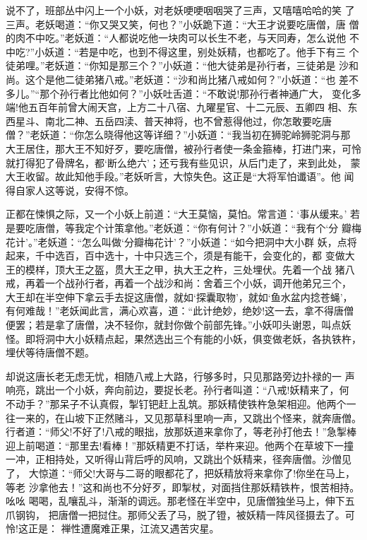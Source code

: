 说不了，班部丛中闪上一个小妖，对老妖哽哽咽咽哭了三声，又嘻嘻哈哈的笑
了三声。老妖喝道：“你又哭又笑，何也？”小妖跪下道：“大王才说要吃唐僧，唐
僧的肉不中吃。”老妖道：“人都说吃他一块肉可以长生不老，与天同寿，怎么说他
不中吃?”小妖道：“若是中吃，也到不得这里，别处妖精，也都吃了。他手下有三
个徒弟哩。”老妖道：“你知是那三个？”小妖道：“他大徒弟是孙行者，三徒弟是
沙和尚。这个是他二徒弟猪八戒。”老妖道：“沙和尚比猪八戒如何？”小妖道：“也
差不多儿。”“那个孙行者比他如何？”小妖吐舌道：“不敢说!那孙行者神通广大，
变化多端!他五百年前曾大闹天宫，上方二十八宿、九曜星官、十二元辰、五卿四
相、东西星斗、南北二神、五岳四渎、普天神将，也不曾惹得他过，你怎敢要吃唐
僧？”老妖道：“你怎么晓得他这等详细？”小妖道：“我当初在狮驼岭狮驼洞与那
大王居住，那大王不知好歹，要吃唐僧，被孙行者使一条金箍棒，打进门来，可怜
就打得犯了骨牌名，都‘断么绝六’；还亏我有些见识，从后门走了，来到此处，
蒙大王收留。故此知他手段。”老妖听言，大惊失色。这正是“大将军怕谶语”。他
闻得自家人这等说，安得不惊。

正都在悚惧之际，又一个小妖上前道：“大王莫恼，莫怕。常言道：‘事从缓来。’
若是要吃唐僧，等我定个计策拿他。”老妖道：“你有何计？”小妖道：“我有个‘分
瓣梅花计’。”老妖道：“怎么叫做‘分瓣梅花计’？”小妖道：“如今把洞中大小群
妖，点将起来，千中选百，百中选十，十中只选三个，须是有能干，会变化的，都
变做大王的模样，顶大王之盔，贯大王之甲，执大王之杵，三处埋伏。先着一个战
猪八戒，再着一个战孙行者，再着一个战沙和尚：舍着三个小妖，调开他弟兄三个，
大王却在半空伸下拿云手去捉这唐僧，就如‘探囊取物’，就如‘鱼水盆内捻苍蝇’，
有何难哉！”老妖闻此言，满心欢喜，道：“此计绝妙，绝妙!这一去，拿不得唐僧
便罢；若是拿了唐僧，决不轻你，就封你做个前部先锋。”小妖叩头谢恩，叫点妖
怪。即将洞中大小妖精点起，果然选出三个有能的小妖，俱变做老妖，各执铁杵，
埋伏等待唐僧不题。

却说这唐长老无虑无忧，相随八戒上大路，行够多时，只见那路旁边扑禄的一
声响亮，跳出一个小妖，奔向前边，要捉长老。孙行者叫道：“八戒!妖精来了，何
不动手？”那呆子不认真假，掣钉钯赶上乱筑。那妖精使铁杵急架相迎。他两个一
往一来的，在山坡下正然赌斗，又见那草科里响一声，又跳出个怪来，就奔唐僧。
行者道：“师父!不好了!八戒的眼拙，放那妖道来拿你了，等老孙打他去！”急掣棒
迎上前喝道：“那里去!看棒！”那妖精更不打话，举杵来迎。他两个在草坡下一撞
一冲，正相持处，又听得山背后呼的风响，又跳出个妖精来，径奔唐僧。沙僧见了，
大惊道：“师父!大哥与二哥的眼都花了，把妖精放将来拿你了!你坐在马上，等老
沙拿他去！”这和尚也不分好歹，即掣杖，对面挡住那妖精铁杵，恨苦相持。吆吆
喝喝，乱嚷乱斗，渐渐的调远。那老怪在半空中，见唐僧独坐马上，伸下五爪钢钩，
把唐僧一把挝住。那师父丢了马，脱了镫，被妖精一阵风径摄去了。可怜!这正是：
禅性遭魔难正果，江流又遇苦灾星。

